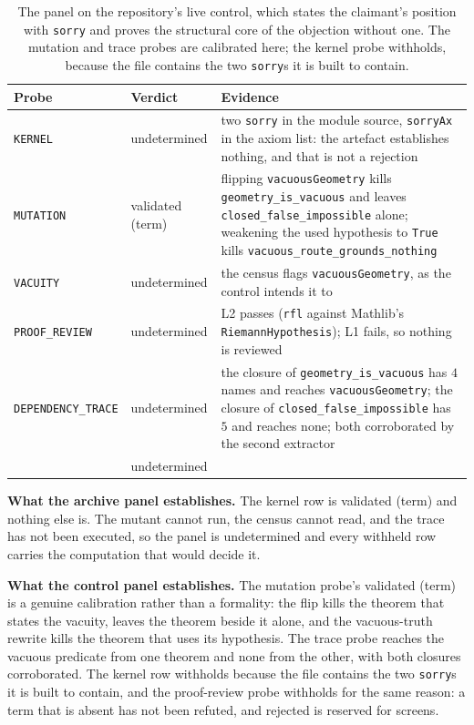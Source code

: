 \documentclass[11pt,a4paper]{article}
\newcommand{\verdict}[1]{\textsf{#1}}
\begin{document}
\begin{table}[htbp]
\centering
\caption{The panel on the repository's live control, which states the claimant's position with
\texttt{sorry} and proves the structural core of the objection without one. The mutation and trace
probes are calibrated here; the kernel probe withholds, because the file contains the two
\texttt{sorry}s it is built to contain.}
\label{tab:control}
\footnotesize
\begin{tabularx}{\textwidth}{@{}>{\raggedright\arraybackslash}p{2.6cm}>{\raggedright\arraybackslash}p{2.4cm}>{\raggedright\arraybackslash}X@{}}
\toprule
Probe & Verdict & Evidence \\
\midrule
\texttt{KERNEL} & \verdict{undetermined} & two \texttt{sorry} in the module source, \texttt{sorryAx}
  in the axiom list: the artefact establishes nothing, and that is not a rejection \\
\texttt{MUTATION} & \verdict{validated (term)} & flipping \texttt{vacuousGeometry} kills
  \texttt{geometry\_is\_vacuous} and leaves \texttt{closed\_false\_impossible} alone; weakening the
  used hypothesis to \texttt{True} kills \texttt{vacuous\_route\_grounds\_nothing} \\
\texttt{VACUITY} & \verdict{undetermined} & the census flags \texttt{vacuousGeometry}, as the
  control intends it to \\
\texttt{PROOF\_REVIEW} & \verdict{undetermined} & L2 passes (\texttt{rfl} against Mathlib's
  \texttt{RiemannHypothesis}); L1 fails, so nothing is reviewed \\
\texttt{DEPENDENCY\_TRACE} & \verdict{undetermined} & the closure of \texttt{geometry\_is\_vacuous}
  has $4$ names and reaches \texttt{vacuousGeometry}; the closure of
  \texttt{closed\_false\_impossible} has $5$ and reaches none; both corroborated by the second
  extractor \\
\midrule
\multicolumn{2}{@{}l}{Aggregated} & \verdict{undetermined} \\
\bottomrule
\end{tabularx}
\end{table}

\textbf{What the archive panel establishes.} The kernel row is \verdict{validated (term)}
and nothing else is. The mutant cannot run, the census cannot read, and the trace has not been
executed, so the panel is \verdict{undetermined} and every withheld row carries the computation that
would decide it.

\textbf{What the control panel establishes.} The mutation probe's \verdict{validated
(term)} is a genuine calibration rather than a formality: the flip kills the theorem that states the
vacuity, leaves the theorem beside it alone, and the vacuous-truth rewrite kills the theorem that
uses its hypothesis. The trace probe reaches the vacuous predicate from one theorem and none from
the other, with both closures corroborated. The kernel row withholds because the file contains the
two \texttt{sorry}s it is built to contain, and the proof-review probe withholds for the same reason: a term
that is absent has not been refuted, and \verdict{rejected} is reserved for screens.
\end{document}

